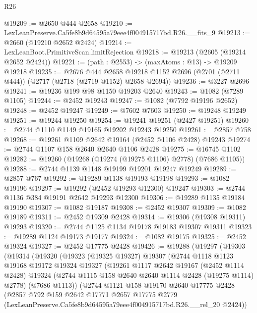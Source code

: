 \begin{lexlean}{R26}
\begin{coremodule}
@19209 := @2650 @444 @2658
@19210 := LexLeanPreserve.Ca5fe8b9d64595a79eee4f004915717bd.R26.__fits_9
@19213 := @2660 (@19210 @2652 @2424)
@19214 := LexLeanBoot.PrimitiveScan.limitRejection
@19218 := @19213 (@2605 (@19214 @2652 @2424))
@19221 := (path : @2553) -> (maxAtoms : @13) -> @19209 @19218
@19235 := @2676
    @444
    @2658
    @19218
    @1152
    @2696
    (@2701 (@2711 @444))
    (@2717 (@2718 (@2719 @1152) @2658 @2694))
@19236 := @3227 @2696
@19241 := @19236 @199 @98 @1150 @19203 @2640
@19243 := @1082 (@7289 @1105)
@19244 := @2452 @19243
@19247 := @1082 (@7792 @19196 @2652)
@19248 := @2452 @19247
@19249 := @7602 @7603
@19250 := @19248 @19249
@19251 := @19244 @19250
@19254 := @19241 @19251 (@2427 @19251)
@19260 := @2744 @1110 @1149 @19165 @19202 @19243 @19250
@19261 := @2857 @758
@19268 := @19261 @1109 @2642 @19164 (@2452 @1106 @2428) @19243
@19274 := @2744 @1107 @158 @2640 @2640 @1106 @2428
@19275 := @16745 @1102
@19282 := @19260 (@19268 (@19274 (@19275 @1106) @2778) (@7686 @1105))
@19288 := @2744 @1139 @1148 @19199 @19201 @19247 @19249
@19289 := @2857 @767
@19292 := @19289 @1138 @19193 @19198
@19293 := @1082 @19196
@19297 := @19292 (@2452 @19293 @12300) @19247
@19303 := @2744 @1136 @384 @19191 @2642 @19293 @12300
@19306 := @19289 @1135 @19184 @19190
@19307 := @1082 @19187
@19308 := @2452 @19307
@19309 := @1082 @19189
@19311 := @2452 @19309 @2428
@19314 := @19306 (@19308 @19311) @19293
@19320 := @2744 @1125 @1134 @19178 @19183 @19307 @19311
@19323 := @19289 @1124 @19173 @19177
@19324 := @1082 @19175
@19325 := @2452 @19324
@19327 := @2452 @17775 @2428
@19426 := @19288
    (@19297
      (@19303
        (@19314
          (@19320
            (@19323
              (@19325 @19327)
              @19307
              (@2744
                @1118
                @1123
                @19168
                @19172
                @19324
                @19327
                (@19261
                  @1117
                  @2642
                  @19167
                  (@2452 @1114 @2428)
                  @19324
                  (@2744 @1115 @158 @2640 @2640 @1114 @2428 (@19275 @1114) @2778)
                  (@7686 @1113))
                (@2744
                  @1121
                  @158
                  @19170
                  @2640
                  @17775
                  @2428
                  (@2857
                    @792
                    @159
                    @2642
                    @17771
                    @2657
                    @17775
                    @2779
                    (LexLeanPreserve.Ca5fe8b9d64595a79eee4f004915717bd.R26.__rel_20 @2424))

\end{coremodule}
\end{lexlean}

